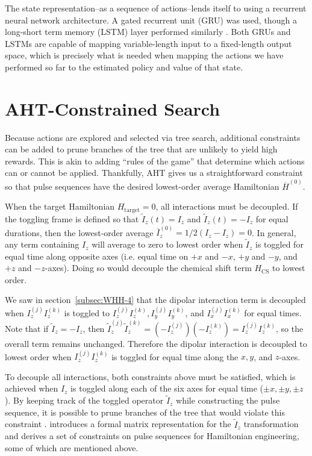 The state representation--as a sequence of actions--lends itself to using a recurrent neural network architecture. A gated recurrent unit (GRU) was used, though a long-short term memory (LSTM) layer performed similarly \cite{cho2014learning, lstm}.
Both GRUs and LSTMs are capable of mapping variable-length input to a fixed-length output space, which is precisely what is needed when mapping the actions we have performed so far to the estimated policy and value of that state.


\section{AHT-Constrained Search}\label{sec:AHT-constraints}

Because actions are explored and selected via tree search, additional constraints can be added to prune branches of the tree that are unlikely to yield high rewards.
This is akin to adding ``rules of the game'' that determine which actions can or cannot be applied.
Thankfully, AHT gives us a straightforward constraint so that pulse sequences have the desired lowest-order average Hamiltonian $\overline{H}^{(0)}$.


When the target Hamiltonian $H_\text{target} = 0$, all interactions must be decoupled. If the toggling frame is defined so that $\widetilde{I}_z(t) = I_z$ and $\widetilde{I}_z(t) = -I_z$ for equal durations, then the lowest-order average $\overline{I}_z^{(0)} = 1/2(I_z - I_z) = 0$. In general, any term containing $I_z$ will average to zero to lowest order when $\widetilde{I}_z$ is toggled for equal time along opposite axes (i.e. equal time on $+x$ and $-x$, $+y$ and $-y$, and $+z$ and $-z$-axes).
Doing so would decouple the chemical shift term $H_\text{CS}$ to lowest order.

We saw in section~\ref{subsec:WHH-4} that the dipolar interaction term is decoupled when $I_z^{(j)}I_z^{(k)}$ is toggled to $I_z^{(j)}I_z^{(k)}, I_y^{(j)}I_y^{(k)}$, and $I_x^{(j)}I_x^{(k)}$ for equal times.
Note that if $\widetilde{I}_z = -I_z$, then $\widetilde{I}_z^{(j)}\widetilde{I}_z^{(k)} = (-I_z^{(j)})(-I_z^{(k)}) = I_z^{(j)}I_z^{(k)}$, so the overall term remains unchanged.
Therefore the dipolar interaction is decoupled to lowest order when $I_z^{(j)}I_z^{(k)}$ is toggled for equal time along the $x, y$, and $z$-axes.

To decouple all interactions, both constraints above must be satisfied, which is achieved when $I_z$ is toggled along each of the six axes for equal time ($\pm x, \pm y, \pm z$). By keeping track of the toggled operator $\widetilde{I}_z$ while constructing the pulse sequence, it is possible to prune branches of the tree that would violate this constraint%
.
\cite{Choi_2020} introduces a formal matrix representation for the $\widetilde{I}_z$ transformation and derives a set of constraints on pulse sequences for Hamiltonian engineering, some of which are mentioned above.

